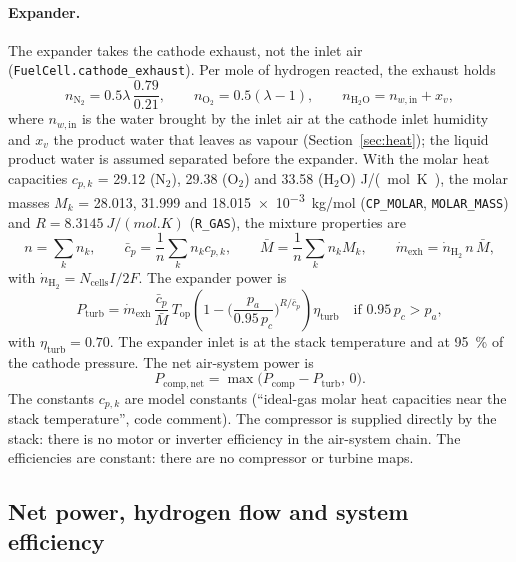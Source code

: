 \documentclass[a4paper,11pt]{article}
\newcommand{\code}[1]{\nolinkurl{#1}}
\newcommand{\fn}[1]{\nolinkurl{#1}}
\begin{document}
\paragraph{Expander.} The expander takes the cathode exhaust, not the inlet air
(\fn{FuelCell.cathode_exhaust}). Per mole of hydrogen reacted, the exhaust holds
\begin{equation}
  n_{\mathrm{N_2}} = 0.5\lambda\,\frac{0.79}{0.21}, \qquad
  n_{\mathrm{O_2}} = 0.5(\lambda-1), \qquad
  n_{\mathrm{H_2O}} = n_{w,\mathrm{in}} + x_v ,
  \label{eq:exhaust}
\end{equation}
where $n_{w,\mathrm{in}}$ is the water brought by the inlet air at the cathode inlet humidity
and $x_v$ the product water that leaves as vapour (Section~\ref{sec:heat}); the liquid product
water is assumed separated before the expander. With the molar heat capacities
$c_{p,k}$ = 29.12 (N$_2$), 29.38 (O$_2$) and 33.58 (H$_2$O) \si{J/(mol.K)}, the molar masses
$M_k$ = 28.013, 31.999 and \SI{18.015e-3}{kg/mol} (\code{CP_MOLAR}, \code{MOLAR_MASS}) and
$R=\SI{8.3145}{J/(mol.K)}$ (\code{R_GAS}), the mixture properties are
\begin{equation}
  n = \sum_k n_k,\qquad
  \bar c_p = \frac{1}{n}\sum_k n_k c_{p,k},\qquad
  \bar M = \frac{1}{n}\sum_k n_k M_k,\qquad
  \dot m_\mathrm{exh} = \dot n_{\mathrm{H_2}}\, n\, \bar M ,
\end{equation}
with $\dot n_{\mathrm{H_2}} = N_\mathrm{cells}I/2F$. The expander power is
\begin{equation}
  P_\mathrm{turb} = \dot m_\mathrm{exh}\,\frac{\bar c_p}{\bar M}\, T_\mathrm{op}
  \left(1-\Big(\frac{p_a}{0.95\,p_c}\Big)^{R/\bar c_p}\right)\eta_\mathrm{turb}
  \quad \text{if } 0.95\,p_c > p_a ,
\end{equation}
with $\eta_\mathrm{turb}=0.70$. The expander inlet is at the stack temperature and at
\SI{95}{\percent} of the cathode pressure. The net air-system power is
\begin{equation}
  P_\mathrm{comp,net} = \max\big(P_\mathrm{comp}-P_\mathrm{turb},\,0\big).
\end{equation}
The constants $c_{p,k}$ are model constants (``ideal-gas molar heat capacities near the stack
temperature'', code comment). The compressor is supplied directly by the stack: there is no
motor or inverter efficiency in the air-system chain. The efficiencies are constant: there are
no compressor or turbine maps.


\subsection{Net power, hydrogen flow and system efficiency}
\label{sec:netpower}
\end{document}
